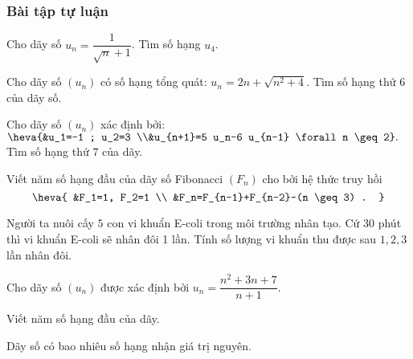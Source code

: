 \subsubsection{Bài tập tự luận}
 
\begin{bt}[NB]%
	Cho dãy số $u_n=\dfrac{1}{\sqrt{n}+1}$. Tìm số hạng $u_4$.	
\end{bt}
\begin{bt}[NB]%
	Cho dãy số $(u_n)$ có số hạng tổng quát: $u_n=2 n+\sqrt{n^2+4}$. Tìm số hạng thứ $6$ của dãy số.
\end{bt}
\begin{bt}[NB]%
	Cho dãy số $(u_n)$ xác định bởi: $\heva{&u_1=-1 ; u_2=3 \\&u_{n+1}=5 u_n-6 u_{n-1} \forall n \geq 2}.$ Tìm số hạng thứ $7$ của dãy.
\end{bt}
\begin{bt}[NB]%
	Viết năm số hạng đầu của dãy số Fibonacci $\left(F_n\right)$ cho bởi hệ thức truy hồi
	$$
	\heva{
		&F_1=1, F_2=1 \\
		&F_n=F_{n-1}+F_{n-2}~(n \geq 3) .
	}
	$$
\end{bt}
\begin{bt}[NB]%
	Người ta nuôi cấy $5$ con vi khuẩn E-coli trong môi trường nhân tạo. Cứ $30$ phút thì vi khuẩn E-coli sẽ nhân đôi 1 lần. Tính số lượng vi khuẩn thu được sau $1,2,3$ lần nhân đôi.
\end{bt}
\begin{bt}[TH]%
	Cho dãy số $(u_n)$ được xác định bởi $u_n=\dfrac{n^2+3n+7}{n+1}$.
	\begin{listEX}
		\item Viết năm số hạng đầu của dãy.
		\item Dãy số có bao nhiêu số hạng nhận giá trị nguyên.
	\end{listEX}
\end{bt}
